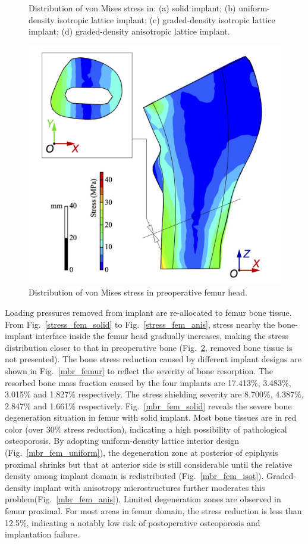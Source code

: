 \documentclass[12pt]{extbook}
\begin{document}
\begin{figure}[htbp]
\caption{Distribution of von Mises stress in: (a) solid implant; (b) uniform-density isotropic lattice implant; (c) graded-density isotropic lattice implant; (d) graded-density anisotropic lattice implant.}
\label{stress_implant}
\end{figure}

\begin{figure}[htbp]
\centering
\includegraphics[width=10 cm]{fig/stress_fem_original}
\caption{Distribution of von Mises stress in preoperative femur head.}
\label{stress_fem_original}
\end{figure}

Loading pressures removed from implant are re-allocated to femur bone tissue. From Fig.~\ref{stress_fem_solid} to Fig.~\ref{stress_fem_anis}, stress nearby the bone-implant interface inside the femur head gradually increases, making the stress distribution closer to that in preoperative bone (Fig.~\ref{stress_fem_original}, removed bone tissue is not presented). The bone stress reduction caused by different implant designs are shown in Fig.~\ref{mbr_femur} to reflect the severity of bone resorption. The resorbed bone mass fraction caused by the four implants are 17.413\%, 3.483\%, 3.015\% and 1.827\% respectively. The stress shielding severity are 8.700\%, 4.387\%, 2.847\% and 1.661\% respectively. Fig.~\ref{mbr_fem_solid} reveals the severe bone degeneration situation in femur with solid implant. Most bone tissues are in red color (over 30\% stress reduction), indicating a high possibility of pathological osteoporosis. By adopting uniform-density lattice interior design (Fig.~\ref{mbr_fem_uniform}), the degeneration zone at posterior of epiphysis proximal shrinks but that at anterior side is still considerable until the relative density among implant domain is redistributed (Fig.~\ref{mbr_fem_isot}). Graded-density implant with anisotropy microstructures further moderates this problem(Fig.~\ref{mbr_fem_anis}). Limited degeneration zones are observed in femur proximal. For most areas in femur domain, the stress reduction is less than 12.5\%, indicating a notably low risk of postoperative osteoporosis and implantation failure.\\
\end{document}
